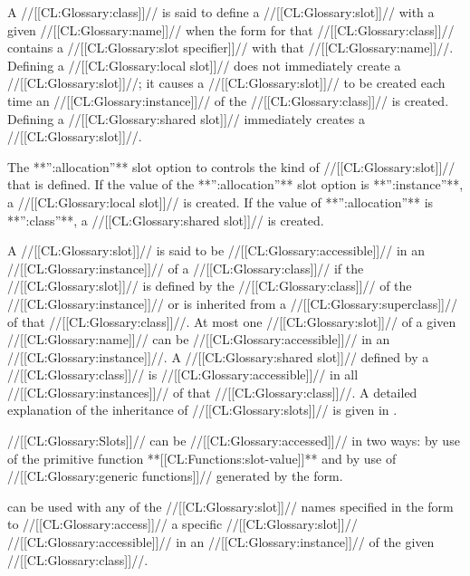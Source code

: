 A //[[CL:Glossary:class]]// is said to define a //[[CL:Glossary:slot]]// with a given //[[CL:Glossary:name]]// when
the  form for that //[[CL:Glossary:class]]// contains a //[[CL:Glossary:slot specifier]]// with
that //[[CL:Glossary:name]]//.  Defining a //[[CL:Glossary:local slot]]// does not immediately create 
a //[[CL:Glossary:slot]]//; it causes a //[[CL:Glossary:slot]]// to be created each time 
an //[[CL:Glossary:instance]]// of the //[[CL:Glossary:class]]// is created.
Defining a //[[CL:Glossary:shared slot]]// immediately creates a //[[CL:Glossary:slot]]//.
                                                    
The **'':allocation''** slot option to  controls the kind
of //[[CL:Glossary:slot]]// that is defined.  If the value of the **'':allocation''** slot
option is **'':instance''**, a //[[CL:Glossary:local slot]]// is created.  If the value of
**'':allocation''** is **'':class''**, a //[[CL:Glossary:shared slot]]// is created.

A //[[CL:Glossary:slot]]// is said to be //[[CL:Glossary:accessible]]// in an //[[CL:Glossary:instance]]// 
of a //[[CL:Glossary:class]]// if
the //[[CL:Glossary:slot]]// is defined by the //[[CL:Glossary:class]]// 
of the //[[CL:Glossary:instance]]// or is inherited from
a //[[CL:Glossary:superclass]]// of that //[[CL:Glossary:class]]//.  
At most one //[[CL:Glossary:slot]]// of a given //[[CL:Glossary:name]]// can be
//[[CL:Glossary:accessible]]// in an //[[CL:Glossary:instance]]//.  
A //[[CL:Glossary:shared slot]]// defined by a //[[CL:Glossary:class]]// is
//[[CL:Glossary:accessible]]// in all //[[CL:Glossary:instances]]// 
of that //[[CL:Glossary:class]]//.  
A detailed explanation of the inheritance of //[[CL:Glossary:slots]]// is given in 
\secref\SlotInheritance.

\endsubSection%

//[[CL:Glossary:Slots]]// can be //[[CL:Glossary:accessed]]// in two ways: by use of the primitive function
**[[CL:Functions:slot-value]]** and by use of //[[CL:Glossary:generic functions]]// generated by
the  form.

 can be used with any of the //[[CL:Glossary:slot]]//
names specified in the  form to //[[CL:Glossary:access]]// a specific
//[[CL:Glossary:slot]]// //[[CL:Glossary:accessible]]// in an //[[CL:Glossary:instance]]// of the given //[[CL:Glossary:class]]//.

